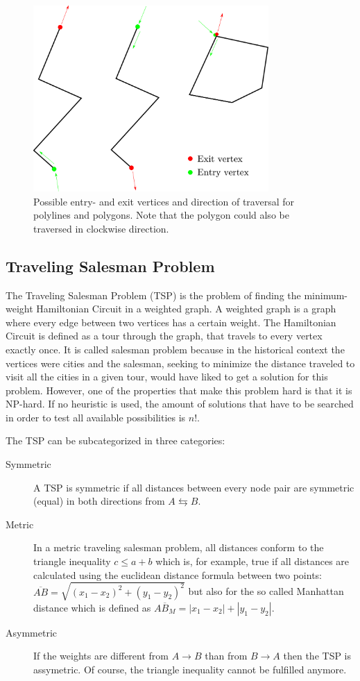 \begin{figure}
\includegraphics[width=0.8\textwidth]{images/path_planning/traversal.pdf}
\caption{Possible entry- and exit vertices and direction of traversal for polylines and polygons. Note that the polygon could also be traversed in clockwise direction.}
\end{figure}

\subsection{Traveling Salesman Problem}

The Traveling Salesman Problem (TSP) is the problem of finding the minimum-weight Hamiltonian Circuit in a weighted graph. A weighted graph is a graph where every edge between two vertices has a certain weight. The Hamiltonian Circuit is defined as a tour through the graph, that travels to every vertex exactly once. It is called salesman problem because in the historical context the vertices were cities and the salesman, seeking to minimize the distance traveled to visit all the cities in a given tour, would have liked to get a solution for this problem. However, one of the properties that make this problem hard is that it is NP-hard. If no heuristic is used, the amount of solutions that have to be searched in order to test all available possibilities is $n!$.

The TSP can be subcategorized in three categories: 

\begin{description}
\item[Symmetric] A TSP is symmetric if all distances between every node pair are symmetric (equal) in both directions from $A \leftrightarrows B$.
\item[Metric] In a metric traveling salesman problem, all distances conform to the triangle inequality $c \leq a + b$ which is, for example, true if all distances are calculated using the euclidean distance formula between two points: $\overline{AB} = \sqrt{(x_1 -x_2)^2 + (y_1 - y_2)^2}$ but also for the so called Manhattan distance which is defined as $\overline{AB_M} = |x_1-x_2| + |y_1 - y_2|$.
\item[Asymmetric] If the weights are different from $A \rightarrow B$ than from $B \rightarrow A$ then the TSP is assymetric. Of course, the triangle inequality cannot be fulfilled anymore.
\end{description}

